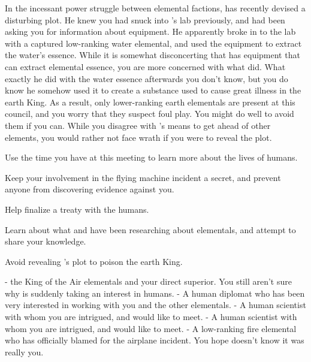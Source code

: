 \documentclass[char]{elementals}
\begin{document}
In the incessant power struggle between elemental factions, \cKing{} has recently devised a disturbing plot.  He knew you had snuck into \cGD{}'s lab previously, and had been asking you for information about  equipment. He apparently broke in to the lab with a captured low-ranking water elemental, and used the equipment to extract the water's essence.  While it is somewhat disconcerting that \cGD{} has equipment that can extract elemental essence, you are more concerned with what \cKing{} did.  What exactly he did with the water essence afterwards you don't know, but you do know he somehow used it to create a substance used to cause great illness in the earth King.  As a result, only lower-ranking earth elementals are present at this council, and you worry that they suspect foul play.  You might do well to avoid them if you can.  While you disagree with \cKing{}'s means to get ahead of other elements, you would rather not face \cKing{\their} wrath if you were to reveal the plot.  

\begin{itemz}[Goals]
  \item Use the time you have at this meeting to learn more about the lives of humans.
  \item Keep your involvement in the flying machine incident a secret, and prevent anyone from discovering evidence against you.
  \item Help \cKing{} finalize a treaty with the humans.
  \item Learn about what \cGD{} and \cScientist{} have been researching about elementals, and attempt to share your knowledge.  
  \item Avoid revealing \cKing{}'s plot to poison the earth King.
\end{itemz}

\begin{contacts}
	\contact{\cKing{\intro}}- the King of the Air elementals and your direct superior.  You still aren't sure why  is suddenly taking an interest in humans.
  \contact{\cDiplomat{\intro}}- A human diplomat who has been very interested in working with you and the other elementals.
  \contact{\cGD{\intro}}- A human scientist with whom you are intrigued, and would like to meet.
  \contact{\cScientist{\intro}}- A human scientist with whom you are intrigued, and would like to meet.
  \contact{\cJuliet{\intro}}- A low-ranking fire elemental who \cKing{} has officially blamed for the airplane incident.  You hope  doesn't know it was really you.
\end{contacts} 
\end{document}
